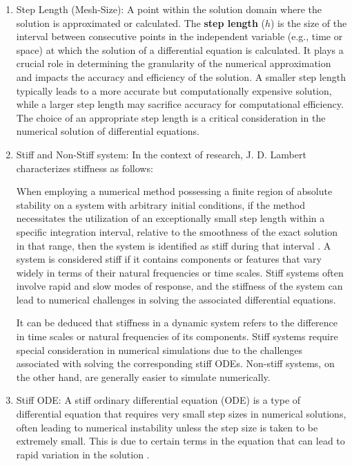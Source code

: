 \begin{enumerate}
    \item Step Length (Mesh-Size): A point within the solution domain where the solution is approximated or calculated. The \textbf{step length} (\(h\)) is the size of the interval between consecutive points in the independent variable (e.g., time or space) at which the solution of a differential equation is calculated. It plays a crucial role in determining the granularity of the numerical approximation and impacts the accuracy and efficiency of the solution. A smaller step length typically leads to a more accurate but computationally expensive solution, while a larger step length may sacrifice accuracy for computational efficiency. The choice of an appropriate step length is a critical consideration in the numerical solution of differential equations.
    
    \item Stiff and Non-Stiff system: 
    In the context of research, J. D. Lambert characterizes stiffness as follows:

When employing a numerical method possessing a finite region of absolute stability on a system with arbitrary initial conditions, if the method necessitates the utilization of an exceptionally small step length within a specific integration interval, relative to the smoothness of the exact solution in that range, then the system is identified as stiff during that interval \cite{lambert1977}.
    A system is considered stiff if it contains components or features that vary widely in terms of their natural frequencies or time scales. Stiff systems often involve rapid and slow modes of response, and the stiffness of the system can lead to numerical challenges in solving the associated differential equations.


It can be deduced that stiffness in a dynamic system refers to the difference in time scales or natural frequencies of its components. Stiff systems require special consideration in numerical simulations due to the challenges associated with solving the corresponding stiff ODEs. Non-stiff systems, on the other hand, are generally easier to simulate numerically.

    \item Stiff ODE: A stiff ordinary differential equation (ODE) is a type of differential equation that requires very small step sizes in numerical solutions, often leading to numerical instability unless the step size is taken to be extremely small. This is due to certain terms in the equation that can lead to rapid variation in the solution \cite{wikipedia-contributors-2023}.


\end{enumerate}
